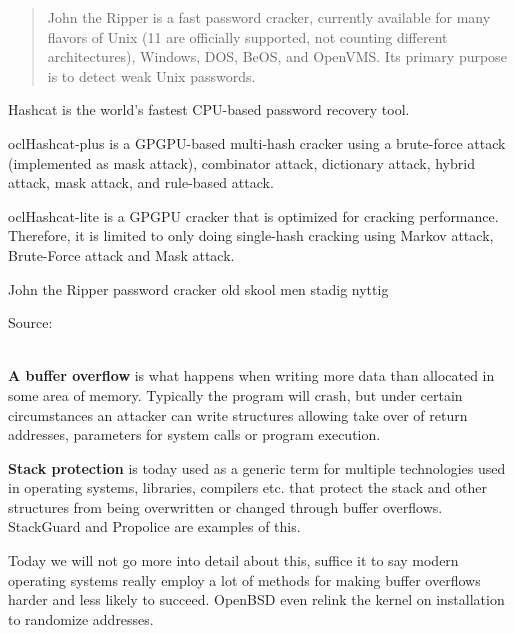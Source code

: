 \documentclass[Screen16to9,17pt]{foils}
\begin{document}


\begin{quote}
John the Ripper is a fast password cracker, currently available for
many flavors of Unix (11 are officially supported, not counting
different architectures), Windows, DOS, BeOS, and OpenVMS. Its primary
purpose is to detect weak Unix passwords.
\end{quote}

\begin{list2}
\item Hashcat is the world's fastest CPU-based password recovery tool.
\item oclHashcat-plus is a GPGPU-based multi-hash cracker using a brute-force attack (implemented as mask attack), combinator attack, dictionary attack, hybrid attack, mask attack, and rule-based attack.
\item oclHashcat-lite is a GPGPU cracker that is optimized for cracking performance. Therefore, it is limited to only doing single-hash cracking using Markov attack, Brute-Force attack and Mask attack.
\item John the Ripper password cracker old skool men stadig nyttig
\end{list2}

Source:\\
\\



\begin{list1}
\item {\bfseries A buffer overflow} is what happens when writing more data than allocated in some area of memory. Typically the program will crash, but under certain circumstances an attacker can write structures allowing take over of return addresses, parameters for system calls or program execution.
\item {\bfseries Stack protection} is today used as a generic term for multiple technologies used in operating systems, libraries, compilers etc. that protect the stack and other structures from being overwritten or changed through buffer overflows. StackGuard
and Propolice are examples of this.
\end{list1}

Today we will not go more into detail about this, suffice it to say modern operating systems really employ a lot of methods for making buffer overflows harder and less likely to succeed. OpenBSD even relink the kernel on installation to randomize addresses.
\end{document}
